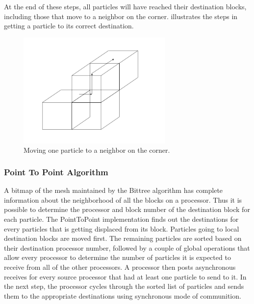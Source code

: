 At the end of these steps, all particles will have reached their
destination blocks, including those that move to a neighbor on the
corner.  illustrates the steps in getting
a particle to its correct destination.
\begin{figure}
\begin{center}
\includegraphics[width=3in]{Grid_ugMoveParticle}
\caption{\label{Fig:ugMoveParticle}
        Moving one particle to a neighbor on the corner.}
\end{center}
\end{figure}

\subsubsection {Point To Point Algorithm}
\label {Sec: ptop_algorithm}
A bitmap of the mesh maintained by the Bittree algorithm has complete
information about the neighborhood of all the blocks on a
processor. Thus it is possible to determine the
processor and block number of the destination block for each particle.
The PointToPoint implementation finds out the destinations for every
particles that is getting displaced from its block. Particles going to
local destination blocks are moved first. The remaining particles are
sorted based on their destination processor number, followed by a
couple of global operations that allow every processor to determine
the number of particles it is expected to receive from all of the
other processors. A processor then posts asynchronous receives for
every source processor that had at least one particle to send to
it. In the next step, the processor cycles through the sorted list of
particles and sends them to the appropriate destinations using
synchronous mode of communition. 


